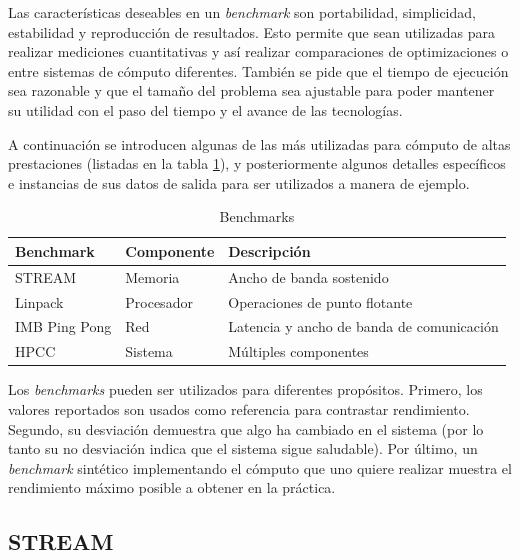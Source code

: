 \documentclass[a4paper]{report}
\begin{document}
\bigskip

Las características deseables en un {\it benchmark} son portabilidad, simplicidad, estabilidad y
reproducción de resultados. Esto permite que sean utilizadas para realizar
mediciones cuantitativas y así realizar comparaciones de optimizaciones o
entre sistemas de cómputo diferentes. También se pide que el tiempo de
ejecución sea razonable y que el tamaño del problema sea ajustable para
poder mantener su utilidad con el paso del tiempo y el avance de las
tecnologías.

\bigskip

A continuación se introducen algunas de las más utilizadas para cómputo
de altas prestaciones (listadas en la tabla \ref{table:benchmark-list}),
y posteriormente algunos detalles específicos e instancias
de sus datos de salida para ser utilizados a manera de ejemplo.

\begin{table}[H]
    \caption{Benchmarks}
    \begin{center}
    \begin{tabular}{|l|l|l|}\hline
      {\bf Benchmark} & {\bf Componente} & {\bf Descripción} \\ \hline
      STREAM & Memoria & Ancho de banda sostenido \\ \hline
      Linpack & Procesador & Operaciones de punto flotante \\ \hline
      IMB Ping Pong & Red & Latencia y ancho de banda de comunicación \\ \hline
      HPCC & Sistema & Múltiples componentes \\ \hline
        \end{tabular}
  \label{table:benchmark-list}
  \end{center}
\end{table}

\bigskip

Los {\it benchmarks} pueden ser utilizados para diferentes propósitos. Primero,
los valores reportados son usados como referencia para contrastar rendimiento.
Segundo, su desviación demuestra que algo ha cambiado en el sistema (por lo tanto
su no desviación indica que el sistema sigue saludable). Por último,
un {\it benchmark} sintético implementando el cómputo que uno quiere realizar
muestra el rendimiento máximo posible a obtener en la práctica.

\subsection{STREAM}
\end{document}
